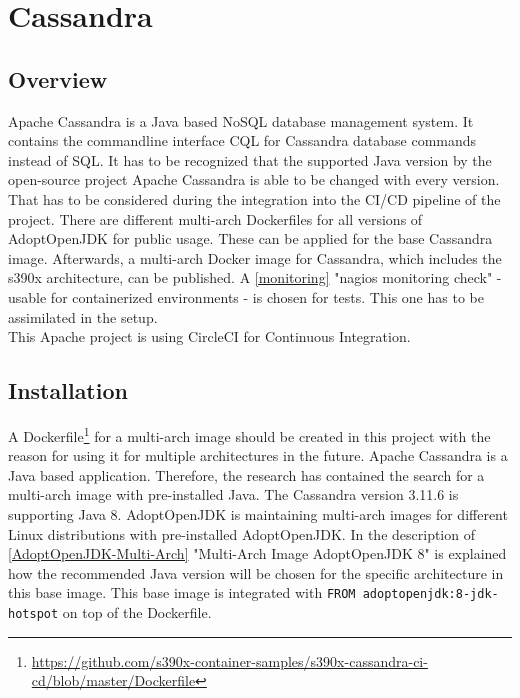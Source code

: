 \chapter{Cassandra}\label{ch:cassandra}

\section{Overview}

Apache Cassandra is a Java based NoSQL database management system. It contains the commandline interface CQL for Cassandra database commands instead of SQL. It has to be recognized that the supported Java version by the open-source project Apache Cassandra is able to be changed with every version. 
That has to be considered during the integration into the CI/CD pipeline of the project. There are different multi-arch Dockerfiles for all versions of AdoptOpenJDK for public usage. These can be applied for the base Cassandra image. Afterwards, a multi-arch Docker image for Cassandra, which includes the s390x architecture, can be published. 
A \ref{monitoring} "nagios monitoring check" - usable for containerized environments - is chosen for tests. This one has to be assimilated in the setup. \\ 
This Apache project is using CircleCI for Continuous Integration. 

\section{Installation}\label{Cassandra-Installation}

A Dockerfile\footnote{\url{https://github.com/s390x-container-samples/s390x-cassandra-ci-cd/blob/master/Dockerfile}} for a multi-arch image should be created in this project with the reason for using it for multiple architectures in the future.
Apache Cassandra is a Java based application. Therefore, the research has contained the search for a multi-arch image with pre-installed Java. The Cassandra version 3.11.6 is supporting Java 8. 
AdoptOpenJDK is maintaining multi-arch images for different Linux distributions with pre-installed AdoptOpenJDK.
In the description of \ref{AdoptOpenJDK-Multi-Arch} "Multi-Arch Image AdoptOpenJDK 8" is explained how the recommended Java version will be chosen for the specific architecture in this base image. 
This base image is integrated with \lstinline!FROM adoptopenjdk:8-jdk-hotspot! on top of the Dockerfile.

